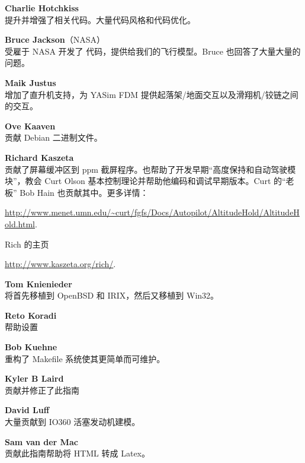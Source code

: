 \noindent \textbf{Charlie Hotchkiss}\\
提升并增强了相关代码。大量代码风格和代码优化。
 \medskip

\noindent \textbf{Bruce Jackson}（NASA）\\
受雇于 NASA 开发了  代码，提供给我们的飞行模型。Bruce 也回答了大量大量的问题。
  \medskip

\noindent \textbf{Maik Justus} \\
增加了直升机支持，为 YASim FDM 提供起落架/地面交互以及滑翔机/铰链之间的交互。
  \medskip

\noindent \textbf{Ove Kaaven} \\
贡献 Debian 二进制文件。
 \medskip

\noindent \textbf{Richard Kaszeta} \\
贡献了屏幕缓冲区到 ppm 截屏程序。也帮助了开发早期“高度保持和自动驾驶模块”，教会 Curt Olson 基本控制理论并帮助他编码和调试早期版本。Curt 的“老板” Bob Hain 也贡献其中。更多详情：
 \medskip

  \href{http://www.menet.umn.edu/~curt/fgfs/Docs/Autopilot/AltitudeHold/AltitudeHold.html}{http://www.menet.umn.edu/\~{}curt/fgfs/Docs/Autopilot/AltitudeHold/AltitudeHold.html}.
  \medskip

\noindent
  Rich 的主页
  \medskip

  \href{http://www.kaszeta.org/rich/}{http://www.kaszeta.org/rich/}.
  \medskip

\noindent \textbf{Tom Knienieder}\\
将首先移植到 OpenBSD 和 IRIX，然后又移植到 Win32。
 \medskip

\noindent \textbf{Reto Koradi}\\
帮助设置
 \medskip

\noindent \textbf{Bob Kuehne}\\
重构了 Makefile 系统使其更简单而可维护。
 \medskip

\noindent \textbf{Kyler B Laird}\\
贡献并修正了此指南
 \medskip

\noindent \textbf{David Luff}\\
大量贡献到 IO360 活塞发动机建模。
 \medskip

\noindent \textbf{Sam van der Mac}\\
贡献此指南帮助将 HTML 转成 Latex。
 \medskip

